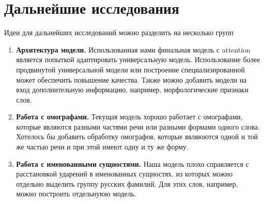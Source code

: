 \documentclass[14pt, a4paper, russian]{extreport}
\newtheorem{definition}{\indent Определение}
\begin{document}
\section*{Дальнейшие исследования}
Идеи для дальнейших исследований можно разделить на несколько групп
\begin{enumerate}[ {(}1{)} ]
	\item \textbf{Архитектура модели.} Использованная нами финальная модель с attention является попыткой адаптировать универсальную модель. Использование более продвинутой универсальной модели или построение специализированной может обеспечить повышение качества. Также можно добавить модели на вход дополнительную информацию, например, морфологические признаки слов.
	\item \textbf{Работа с омографами.}  Текущая модель хорошо работает с омографами, которые являются разными частями речи или разными формами одного слова. Хотелось бы добавить обработку омографов, которые являюются одной и той же частью речи и при этой имеют одну и ту же форму.
	\item \textbf{Работа с именованными сущностями.} Наша  модель плохо справляется с расстановкой ударений в именованных сущностях, из которых можно отдельно выделить группу русских фамилий. Для этих слов, например, можно построить отдельнуюю модель.
	
\end{enumerate}

\newpage
{}




\end{document}
